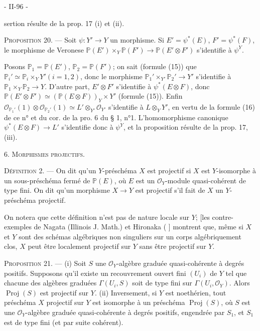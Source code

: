\newpage


- II-96 -

sertion résulte de la prop. 17 (i) et (ii).

\textsc{Proposition 20.} — Soit $\psi: Y' \to Y$ un morphisme. Si $E' = \psi^*(E)$, $F' = \psi^*(F)$, le morphisme de Veronese $\mathbb{P}(E') \times_Y \mathbb{P}(F') \to \mathbb{P}(E' \otimes F')$ s'identifie à $\psi^Y$.

Posons $\mathbb{P}_1 = \mathbb{P}(E')$, $\mathbb{P}_2 = \mathbb{P}(F')$; on sait (formule (15)) que $\mathbb{P}_i' \simeq \mathbb{P}_i \times_Y Y' (i=1,2)$, donc le morphisme $\mathbb{P}_1' \times_{Y'} \mathbb{P}_2' \to Y'$ s'identifie à $\mathbb{P}_1 \times_Y \mathbb{P}_2 \to Y$. D'autre part, $E' \otimes F'$ s'identifie à $\psi^*(E \otimes F)$, donc $\mathbb{P}(E' \otimes F') \simeq (\mathbb{P}(E \otimes F))_Y \times Y'$ (formule (15)). Enfin $\mathcal{O}_{\mathbb{P}_1'}(1) \otimes \mathcal{O}_{\mathbb{P}_2'}(1) \simeq L' \otimes_{Y'} \mathcal{O}_{Y'}$ s'identifie à $L \otimes_Y Y'$, en vertu de la formule (16) de ce n° et du cor. de la pro. 6 du § 1, n°1. L'homomorphisme canonique $\psi^*(E \otimes F) \to L'$ s'identifie donc à $\psi^Y$, et la proposition résulte de la prop. 17, (iii).

\textsc{6. Morphismes projectifs.}

\textsc{Définition 2.} — On dit qu'un $Y$-préschéma $X$ est projectif si $X$ est $Y$-isomorphe à un sous-préschéma fermé de $\mathbb{P}(E)$, où $E$ est un $\mathcal{O}_Y$-module quasi-cohérent de type fini. On dit qu'un morphisme $X \to Y$ est projectif s'il fait de $X$ un $Y$-préschéma projectif.

On notera que cette définition n'est pas de nature locale sur $Y$; [les contre-exemples de Nagata (Illinois J. Math.) et Hironaka ( ] montrent que, même si $X$ et $Y$ sont des schémas algébriques non singuliers sur un corps algébriquement clos, $X$ peut être localement projectif sur $Y$ sans être projectif sur $Y$.

\textsc{Proposition 21.} — (i) Soit $S$ une $\mathcal{O}_Y$-algèbre graduée quasi-cohérente à degrés positifs. Supposons qu'il existe un recouvrement ouvert fini $(U_i)$ de $Y$ tel que chacune des algèbres graduées $\Gamma(U_i, S)$ soit de type fini sur $\Gamma(U_i, \mathcal{O}_Y)$. Alors $\operatorname{Proj}(S)$ est projectif sur $Y$.
(ii) Inversement, si $Y$ est noethérien, tout préschéma $X$ projectif sur $Y$ est isomorphe à un préschéma $\operatorname{Proj}(S)$, où $S$ est une $\mathcal{O}_Y$-algèbre graduée quasi-cohérente à degrés positifs, engendrée par $S_1$, et $S_1$ est de type fini (et par suite cohérent).

